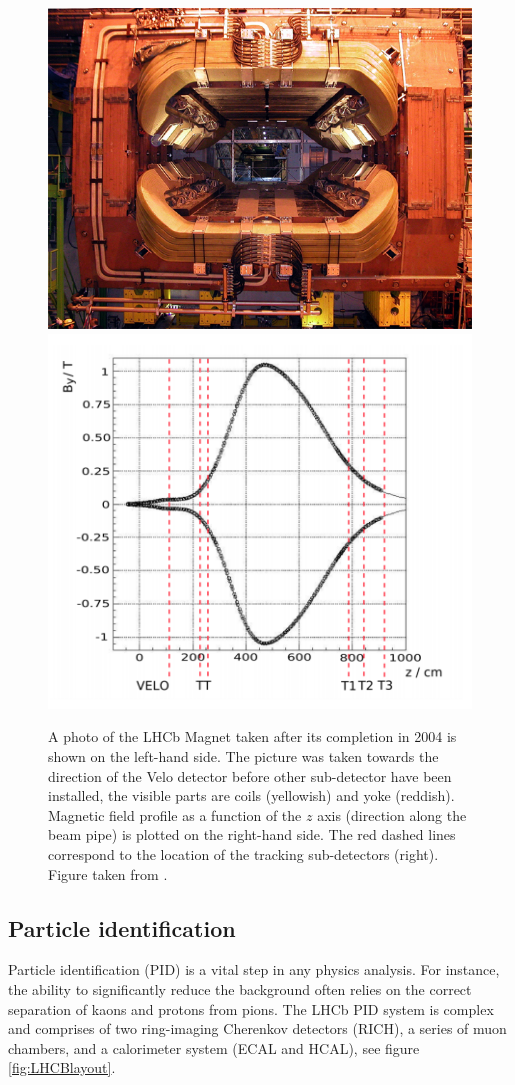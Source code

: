 \begin{figure}[h]
 \begin{center}
  \includegraphics[width=0.49\linewidth]{figures/magnet_photo.jpg}
   \includegraphics[width=0.49\linewidth]{figures/magnet_profile.PNG}
   \caption{A photo of the LHCb Magnet taken after its completion in 2004 is shown on the left-hand side. The picture was taken towards the direction of the Velo detector before other sub-detector have been installed, the visible parts are coils (yellowish) and yoke (reddish). Magnetic field profile as a function of the $z$ axis (direction along the beam pipe) is plotted on the right-hand side. The red dashed lines correspond to the location of the tracking sub-detectors (right). Figure taken from \cite{lhcb}.   
     \label{fig:magnet}}
 \end{center}
\end{figure}


\subsection{Particle identification}

Particle identification (PID) is a vital step in any physics analysis. For instance, the ability to significantly reduce the background often relies on the correct separation of kaons and protons from pions. The LHCb PID system is complex and comprises of two ring-imaging Cherenkov detectors (RICH), a series of muon chambers, and a calorimeter system (ECAL and HCAL), see figure \ref{fig:LHCBlayout}. 


